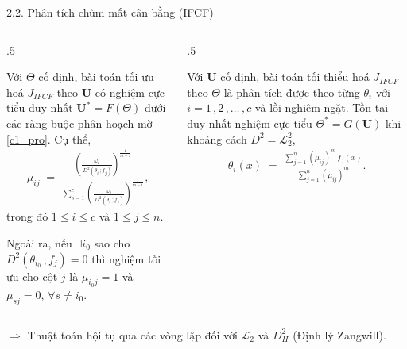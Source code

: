 \documentclass[oneside, aspectratio=169]{beamer}
\begin{document}
\begin{frame}{2.2. Phân tích chùm mất cân bằng (IFCF)}
	\begin{columns}
		\begin{column}{.5\textwidth}
			\small
			\begin{lemma}\label{lem1}
				Với $\Theta$ cố định, bài toán tối ưu hoá $J_{IFCF}$ theo $\bm U$ có nghiệm cực tiểu duy nhất $\bm U^*=F(\Theta)$ dưới các ràng buộc phân hoạch mờ \eqref{c1_pro}. Cụ thể,
				\begin{align}
					\mu_{ij} \;=\;
					\frac{
						\left (\frac{\omega_i}{\,D^2(\theta_i\,;f_j)}\right)^{\frac{1}{m-1}}
					}{
						\sum_{s=1}^c
						\left(\frac{\omega_s}{\,D^2(\theta_s\,;f_j)}\right)^{\frac{1}{m-1}}
					},
					\label{eq:ifcf_u_final}
				\end{align}
				trong đó $1\le i\le c$ và $1\le j\le n$.
			\end{lemma}
			Ngoài ra, nếu $\exists i_0$ sao cho $D^2(\theta_{i_0}\,;f_j)=0$ thì nghiệm tối ưu cho cột $j$ là $\mu_{i_0 j}=1$ và $\mu_{s j}=0$, $\forall s\neq i_0$.
		\end{column}
		\begin{column}{.5\textwidth}
			\small
			\begin{lemma}\label{lem2}
				Với $\bm U$ cố định, bài toán tối thiểu hoá $J_{IFCF}$ theo $\Theta$ là phân tích được theo từng $\theta_i$ với $i =1\,,2\,,\ldots\,,c$ và lồi nghiêm ngặt. Tồn tại duy nhất nghiệm cực tiểu $\Theta^*=G(\bm U)$ khi khoảng cách $D^2=\mathcal{L}_2^2$, 
				\begin{align}
					\theta_i(x)
					\;=\;
					\frac{\sum_{j=1}^n (\mu_{ij})^{m}\,f_j(x)}
					{\sum_{j=1}^n (\mu_{ij})^{m}}.
					\label{eq:theta_update}
				\end{align}
			\end{lemma}
		\end{column}
	\end{columns}
	{\color{CTUblue}
		$\Rightarrow$ Thuật toán hội tụ qua các vòng lặp đối với $\mathcal{L}_2$ và $D_H^2$ (Định lý Zangwill).
		}
\end{frame}
\end{document}
